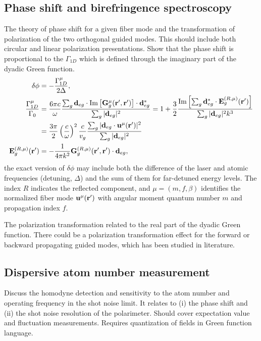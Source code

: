 \documentclass[preprint,pra,onecolumn]{revtex4-1} %
\begin{document}
\subsection{Phase shift and birefringence spectroscopy}
The theory of phase shift for a given fiber mode and the transformation of polarization of the two orthogonal guided modes. This should include both circular and linear polarization presentations. Show that the phase shift is proportional to the $ \Gamma_{1D} $ which is defined through the imaginary part of the dyadic Green function. 
\begin{align}
\delta\phi &= -\frac{\Gamma_{1D}^\mu}{2\Delta},\\
\frac{\Gamma_{1D}^\mu}{\Gamma_0} &= \frac{6\pi c}{\omega}\frac{\sum_g\mathbf{d}_{eg}\cdot \mathrm{Im}\left[\mathbf{G}_g^\mu(\mathbf{r}',\mathbf{r}') \right]\cdot\mathbf{d}_{eg}^* }{\sum_g|\mathbf{d}_{eg}|^2} = 1+ \frac{3}{2} \frac{\mathrm{Im}\left[\sum_g\mathbf{d}_{eg}^*\cdot \mathbf{E}^{(R,\mu)}_g(\mathbf{r}') \right]}{\sum_g|\mathbf{d}_{eg}|^2 k^3}\nonumber\\
&=\frac{3\pi}{2}\left(\frac{c}{\omega}\right)^2\frac{c}{v_g} \frac{\sum_{g}|\mathbf{d}_{eg}\cdot \mathbf{u}^\mu(\mathbf{r}')|^2}{\sum_g|\mathbf{d}_{eg}|^2}\\
\mathbf{E}^{(R,\mu)}_g(\mathbf{r}') &= -\frac{1}{4\pi k^2} \mathbf{G}^{(R,\mu)}_g(\mathbf{r}',\mathbf{r}')\cdot \mathbf{d}_{eg},
\end{align}
the exact version of $ \delta\phi $ may include both the difference of the laser and atomic frequencies (detuning, $ \Delta $) and the sum of them for far-detuned energy levels. The index $ R $ indicates the reflected component, and $\mu=(m,f,\beta)  $ identifies the normalized fiber mode $ \mathbf{u}^\mu(\mathbf{r}') $ with angular moment quantum number $ m $ and propagation index $ f $. 

The polarization transformation related to the real part of the dyadic Green function. There could be a polarization transformation effect for the forward or backward propagating guided modes, which has been studied in literature. 

\subsection{Dispersive atom number measurement}

Discuss the homodyne detection and sensitivity to the atom number and operating frequency in the shot noise limit.  It relates to (i) the phase shift and (ii) the shot noise resolution of the polarimeter. Should cover expectation value and fluctuation measurements. Requires quantization of fields in Green function language.
\end{document}
